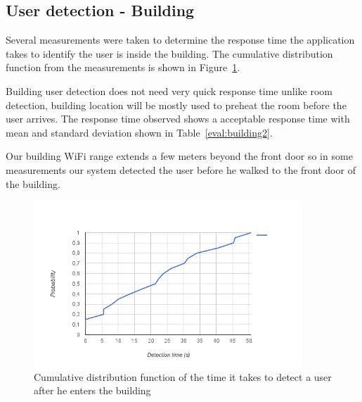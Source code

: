 \subsection{User detection - Building}

Several measurements were taken to determine the response time the application takes to identify the user is inside the building. The cumulative distribution function from the measurements is shown in Figure~\ref{eval:building1}.

Building user detection does not need very quick response time unlike room detection, building location will be mostly used to preheat the room before the user arrives. The response time observed shows a acceptable response time with mean and standard deviation shown in Table~\ref{eval:building2}.



Our building \ac{WiFi} range extends a few meters beyond the front door so in some measurements our system detected the user before he walked to the front door of the building.

\begin{figure}[h]
\centering
\includegraphics[width=0.9\textwidth]{Figures/building_detection_cumulative}
\caption{Cumulative distribution function of the time it takes to detect a user  after he enters the building}
\label{eval:building1}
\end{figure}





